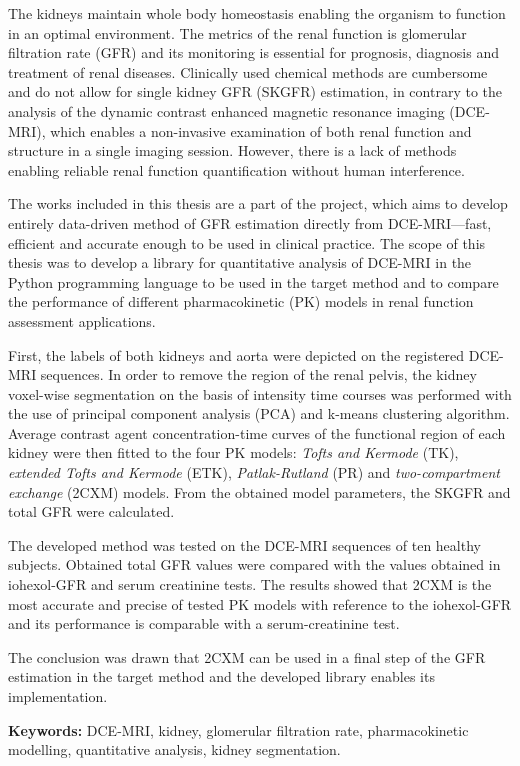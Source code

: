 	\begin{spacing}{1.0}
		\begin{small}

The kidneys maintain whole body homeostasis enabling the organism to function in an optimal environment. The metrics of the renal function is glomerular filtration rate (GFR) and its monitoring is essential for prognosis, diagnosis and treatment of renal diseases. Clinically used chemical methods are cumbersome and do not allow for single kidney GFR (SKGFR) estimation,  in contrary to the analysis of the dynamic contrast enhanced magnetic resonance imaging  (DCE-MRI), which enables a non-invasive examination of both renal function and structure in a single imaging session. However, there is a lack of methods enabling reliable renal function quantification without human interference.

The works included in this thesis are a part of the project, which aims to develop entirely data-driven method of GFR estimation directly from DCE-MRI---fast, efficient and accurate enough to be used in clinical practice. 
The scope of this thesis was to develop a library for quantitative analysis of DCE-MRI in the Python programming language to be used in the target method and to compare the performance of different pharmacokinetic (PK) models in renal function assessment applications.

First, the labels of both kidneys and aorta were depicted on the registered DCE-MRI sequences. In order to remove the region of the renal pelvis, the kidney voxel-wise segmentation on the basis of intensity time courses was performed with the use of principal component analysis (PCA) and k-means clustering algorithm. Average contrast agent concentration-time curves of the functional region of each kidney were then fitted to the four PK models: \textit{Tofts and Kermode} (TK), \textit{extended Tofts and Kermode} (ETK), \textit{Patlak-Rutland} (PR) and \textit{two-compartment exchange} (2CXM) models. From the obtained model parameters, the SKGFR and total GFR were calculated.   

The developed method was tested on the DCE-MRI sequences of ten healthy subjects. Obtained total GFR values were compared with the values obtained in iohexol-GFR and serum creatinine tests.
The results showed that 2CXM is the most accurate and precise of tested PK models with reference to the iohexol-GFR and its performance is comparable with a serum-creatinine test. 

The conclusion was drawn that 2CXM can be used in a final step of the GFR estimation in the target method and the developed library enables its implementation.   

		
		
		\end{small}

		
		\vfill
		\normalsize \noindent \textbf{Keywords:} DCE-MRI, kidney, glomerular filtration rate, pharmacokinetic modelling, quantitative analysis, kidney segmentation.  
				
				\end{spacing}	

	\newpage
\thispagestyle{empty}
\mbox{}	

